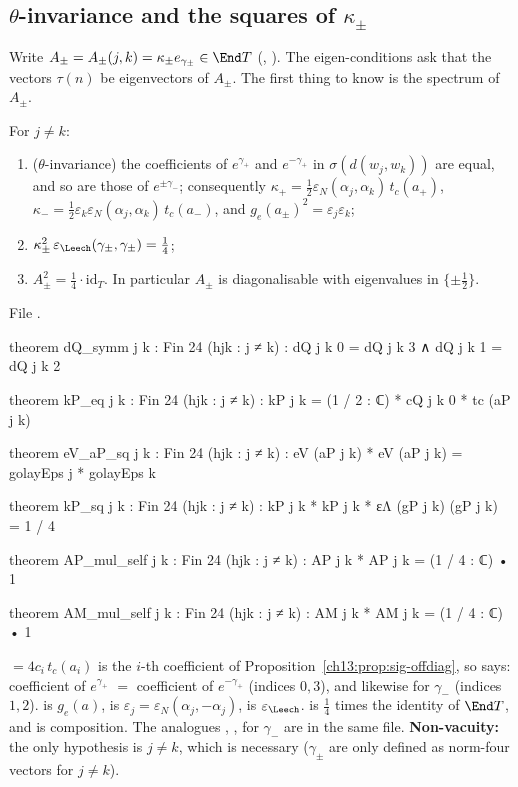 \subsection{\texorpdfstring{$\theta$-invariance and the squares of $\kappa_\pm$}{theta-invariance and the squares of kappapm}}
Write $A_\pm=A_\pm(j,k)=\kappa_\pm e_{\gamma_\pm}\in\End T$ (, ). The eigen-conditions
ask that the vectors $\tau(n)$ be eigenvectors of $A_\pm$. The first thing to know is the spectrum of
$A_\pm$.
\begin{proposition}\label{ch13:prop:kappa}
For $j\ne k$:
\begin{enumerate}[label=(\alph*)]
\item ($\theta$-invariance) the coefficients of $e^{\gamma_+}$ and $e^{-\gamma_+}$ in $\sigma(d(w_j,w_k))$ are equal,
  and so are those of $e^{\pm\gamma_-}$; consequently $\kappa_+=\tfrac12\varepsilon_N(\alpha_j,\alpha_k)\,t_c(a_+)$,
  $\kappa_-=\tfrac12\varepsilon_k\varepsilon_N(\alpha_j,\alpha_k)\,t_c(a_-)$, and $g_e(a_\pm)^2=\varepsilon_j\varepsilon_k$;
\item $\kappa_\pm^2\,\varepsilon_\Leech(\gamma_\pm,\gamma_\pm)=\tfrac14$;
\item $A_\pm^2=\tfrac14\cdot\mathrm{id}_T$. In particular $A_\pm$ is diagonalisable with eigenvalues in
  $\{\pm\tfrac12\}$.
\end{enumerate}
\end{proposition}
\noindent File .
\begin{leancode}
theorem dQ_symm {j k : Fin 24} (hjk : j ≠ k) : dQ j k 0 = dQ j k 3 ∧ dQ j k 1 = dQ j k 2

theorem kP_eq {j k : Fin 24} (hjk : j ≠ k) : kP j k = (1 / 2 : ℂ) * cQ j k 0 * tc (aP j k)

theorem eV_aP_sq {j k : Fin 24} (hjk : j ≠ k) : eV (aP j k) * eV (aP j k) = golayEps j * golayEps k

theorem kP_sq {j k : Fin 24} (hjk : j ≠ k) : kP j k * kP j k * εΛ (gP j k) (gP j k) = 1 / 4

theorem AP_mul_self {j k : Fin 24} (hjk : j ≠ k) : AP j k * AP j k = (1 / 4 : ℂ) • 1

theorem AM_mul_self {j k : Fin 24} (hjk : j ≠ k) : AM j k * AM j k = (1 / 4 : ℂ) • 1
\end{leancode}
\begin{dictionary}
 $=4c_i\,t_c(a_i)$ is the $i$-th coefficient of Proposition~\ref{ch13:prop:sig-offdiag}, so
 says: coefficient of $e^{\gamma_+}$ $=$ coefficient of $e^{-\gamma_+}$ (indices $0,3$), and
likewise for $\gamma_-$ (indices $1,2$).  is $g_e(a)$,  is $\varepsilon_j=\varepsilon_N(\alpha_j,-\alpha_j)$,
 is $\varepsilon_\Leech$.  is $\tfrac14$ times the identity of $\End T$, and
 is composition. The analogues , ,  for
$\gamma_-$ are in the same file. \textbf{Non-vacuity:} the only hypothesis is $j\ne k$, which is necessary
($\gamma_\pm$ are only defined as norm-four vectors for $j\neq k$).
\end{dictionary}

